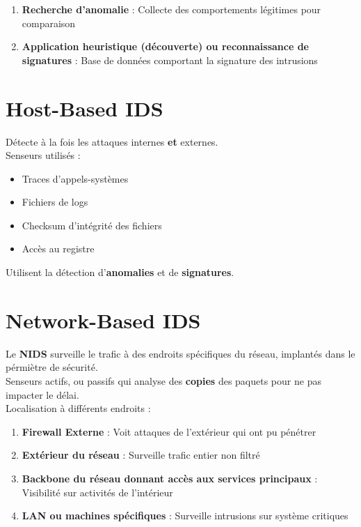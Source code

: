 \documentclass{report}
\begin{document}
		\begin{enumerate}
			\item \textbf{Recherche d'anomalie} : Collecte des comportements légitimes pour comparaison
			\item \textbf{Application heuristique (découverte) ou reconnaissance de signatures} : Base de données comportant la signature des intrusions\\
		\end{enumerate}

	\section{Host-Based IDS}

		Détecte à la fois les attaques internes \textbf{et} externes.\\

		Senseurs utilisés : \\

		\begin{itemize}
			\item Traces d'appels-systèmes
			\item Fichiers de logs
			\item Checksum d'intégrité des fichiers
			\item Accès au registre\\
		\end{itemize}

		Utilisent la détection d'\textbf{anomalies} et de \textbf{signatures}.\\

	\section{Network-Based IDS}

		Le \textbf{NIDS} surveille le trafic à des endroits spécifiques du réseau, implantés dans le pérmiètre de sécurité.\\

		Senseurs actifs, ou passifs qui analyse des \textbf{copies} des paquets pour ne pas impacter le délai.\\

		Localisation à différents endroits : \\

		\begin{enumerate}
			\item \textbf{Firewall Externe} : Voit attaques de l'extérieur qui ont pu pénétrer
			\item \textbf{Extérieur du réseau} : Surveille trafic entier non filtré
			\item \textbf{Backbone du réseau donnant accès aux services principaux} : Visibilité sur activités de l'intérieur
			\item \textbf{LAN ou machines spécifiques} : Surveille intrusions sur système critiques\\
		\end{enumerate}
\end{document}
